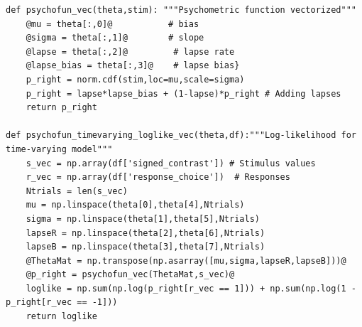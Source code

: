 \documentclass[paper=a4, fontsize=11pt]{scrartcl}
\numberwithin{equation}{section}		%
\numberwithin{figure}{section}			%
\numberwithin{table}{section}				%
\begin{document}
\begin{lstlisting}[style=base]
def psychofun_vec(theta,stim): """Psychometric function vectorized"""
    @mu = theta[:,0]@           # bias
    @sigma = theta[:,1]@        # slope
    @lapse = theta[:,2]@         # lapse rate
    @lapse_bias = theta[:,3]@    # lapse bias}
    p_right = norm.cdf(stim,loc=mu,scale=sigma)    
    p_right = lapse*lapse_bias + (1-lapse)*p_right # Adding lapses
    return p_right

def psychofun_timevarying_loglike_vec(theta,df):"""Log-likelihood for time-varying model"""
    s_vec = np.array(df['signed_contrast']) # Stimulus values
    r_vec = np.array(df['response_choice'])  # Responses
    Ntrials = len(s_vec)
    mu = np.linspace(theta[0],theta[4],Ntrials)
    sigma = np.linspace(theta[1],theta[5],Ntrials)
    lapseR = np.linspace(theta[2],theta[6],Ntrials)
    lapseB = np.linspace(theta[3],theta[7],Ntrials)
    @ThetaMat = np.transpose(np.asarray([mu,sigma,lapseR,lapseB]))@ 
    @p_right = psychofun_vec(ThetaMat,s_vec)@
    loglike = np.sum(np.log(p_right[r_vec == 1])) + np.sum(np.log(1 - p_right[r_vec == -1]))
    return loglike
\end{lstlisting}
\end{document}

